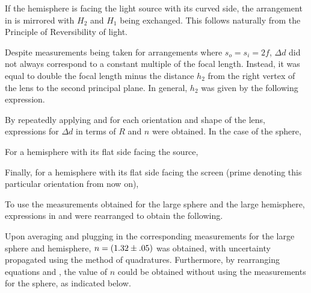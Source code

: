 \begin{paper}
	
	If the hemisphere is facing the light source with its curved side, the arrangement in \figHemisphere is mirrored with \( H_2 \) and \( H_1 \) being exchanged. This follows naturally from the Principle of Reversibility of light. 
	
	
	Despite measurements being taken for arrangements where \( s_o = s_i = 2f \), \( \Delta d \) did not always correspond to a constant multiple of the focal length. Instead, it was equal to double the focal length minus the distance \( h_2 \) from the right vertex of the lens to the second principal plane. In general, \( h_2 \) was given by the following expression.
	
	By repeatedly applying \eqVertexToSecondaryPrincipalPlane and \eqLensMakersFormula for each orientation and shape of the lens, expressions for \( \Delta d \) in terms of \( R \) and \( n \) were obtained. In the case of the sphere,
	
	For a hemisphere with its flat side facing the source, 
	
	Finally, for a hemisphere with its flat side facing the screen (prime denoting this particular orientation from now on),
	
	To use the measurements obtained for the large sphere and the large hemisphere, expressions in \eqSphereData and \eqHemisphereFlatScreen were rearranged to obtain the following.
	
	Upon averaging and plugging in the corresponding measurements for the large sphere and hemisphere, \( n = \left(1.32 \pm .05\right) \) was obtained, with uncertainty propagated using the method of quadratures. Furthermore, by rearranging equations \eqHemisphereFlatSource and \eqHemisphereFlatScreen, the value of \( n \) could be obtained without using the measurements for the sphere, as indicated below.
	

\end{paper}
